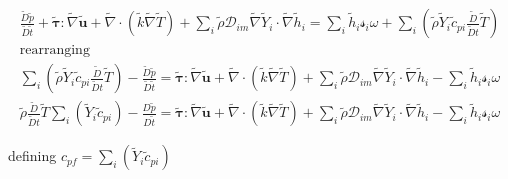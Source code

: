 \documentclass[preprint,12pt,authoryear]{elsarticle}
\begin{document}
\begin{equation}
\begin{split}
\\
        \frac{\tilde{D} \tilde{p}}{\tilde{D}\tilde{t}}
        +       
        \pmb{\tilde{\tau}}:\tilde{\nabla} \tilde{\mathbf{u}} 
        + 
        \tilde{\nabla} \cdot (\tilde{k}\tilde{\nabla} \tilde{T})
        +
        \sum\limits_i 
        \tilde{\rho}
        \mathcal{D}_{im}
        \tilde{\nabla}
        \tilde{Y}_i     
        \cdot
        \tilde{\nabla} 
        \tilde{h}_i
        =
        \sum\limits_i
        \tilde{h}_i
        \mathcal{s}_i  \omega
	+
        \sum\limits_i
        \left(
                \tilde{\rho}
                \tilde{Y}_i
                \tilde{c}_{pi}
                \frac{\tilde{D}}{\tilde{D} t}
                \tilde{T}
        \right)
\\
\text{rearranging}
\\
        \sum\limits_i
        \left(
                \tilde{\rho}
                \tilde{Y}_i
                \tilde{c}_{pi}
                \frac{\tilde{D}}{\tilde{D} t}
                \tilde{T}
        \right)
        -
        \frac{\tilde{D} \tilde{p}}{\tilde{D}\tilde{t}}
        =
        \pmb{\tilde{\tau}}:\tilde{\nabla} \tilde{\mathbf{u}} 
        + 
        \tilde{\nabla} \cdot (\tilde{k}\tilde{\nabla} \tilde{T})
        +
        \sum\limits_i 
        \tilde{\rho}
        \mathcal{D}_{im}
        \tilde{\nabla}
        \tilde{Y}_i     
        \cdot
        \tilde{\nabla} 
        \tilde{h}_i
	-
        \sum\limits_i
        \tilde{h}_i
        \mathcal{s}_i \omega
\\
        \tilde{\rho}
        \frac{\tilde{D}}{\tilde{D} t}
        \tilde{T}
        \sum\limits_i
        \left(
                \tilde{Y}_i
                \tilde{c}_{pi}
        \right)
        -
        \frac{D \tilde{p}}{D\tilde{t}}
        =
        \pmb{\tilde{\tau}}:\tilde{\nabla} \tilde{\mathbf{u}} 
        + 
        \tilde{\nabla} \cdot (\tilde{k}\tilde{\nabla} \tilde{T})
        +
        \sum\limits_i 
        \tilde{\rho}
        \mathcal{D}_{im}
        \tilde{\nabla}
        \tilde{Y}_i     
        \cdot
        \tilde{\nabla} 
        \tilde{h}_i
	-
        \sum\limits_i
        \tilde{h}_i
        \mathcal{s}_i \omega	
\end{split}
\end{equation}

defining 
$
{c}_{pf}
=
\sum\limits_i
\left(
        \tilde{Y}_i
        \tilde{c}_{pi}
\right)
$
\end{document}

